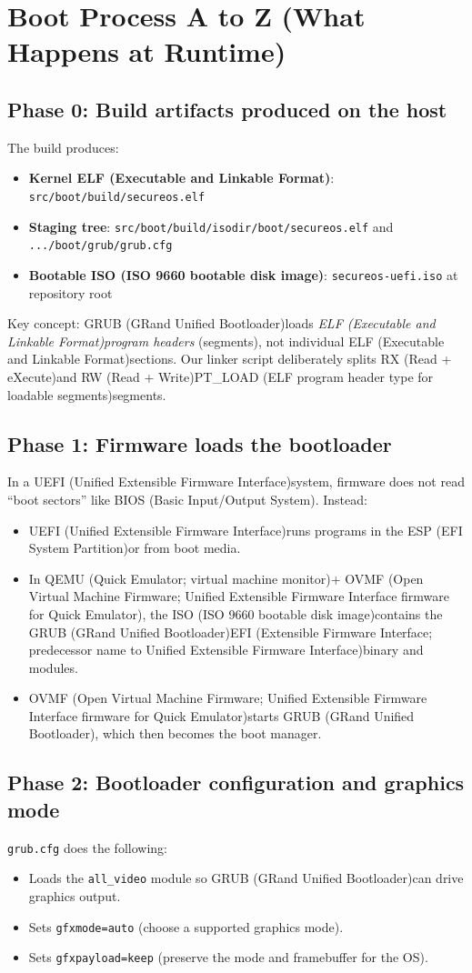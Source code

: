 \documentclass[11pt]{article}
\newcommand{\BIOS}{BIOS (Basic Input/Output System)}
\newcommand{\EFI}{EFI (Extensible Firmware Interface; predecessor name to Unified Extensible Firmware Interface)}
\newcommand{\ESP}{ESP (EFI System Partition)}
\newcommand{\ELF}{ELF (Executable and Linkable Format)}
\newcommand{\GRUB}{GRUB (GRand Unified Bootloader)}
\newcommand{\ISOImg}{ISO (ISO 9660 bootable disk image)}
\newcommand{\OVMF}{OVMF (Open Virtual Machine Firmware; Unified Extensible Firmware Interface firmware for Quick Emulator)}
\newcommand{\PTLOAD}{PT\_LOAD (ELF program header type for loadable segments)}
\newcommand{\QEMU}{QEMU (Quick Emulator; virtual machine monitor)}
\newcommand{\RW}{RW (Read + Write)}
\newcommand{\RX}{RX (Read + eXecute)}
\newcommand{\UEFI}{UEFI (Unified Extensible Firmware Interface)}
\begin{document}
\newpage
\section{Boot Process A to Z (What Happens at Runtime)}

\subsection{Phase 0: Build artifacts produced on the host}
The build produces:
\begin{itemize}
  \item \textbf{Kernel \ELF}: \texttt{src/boot/build/secureos.elf}
  \item \textbf{Staging tree}: \texttt{src/boot/build/isodir/boot/secureos.elf} and \texttt{.../boot/grub/grub.cfg}
  \item \textbf{Bootable \ISOImg}: \texttt{secureos-uefi.iso} at repository root
\end{itemize}

Key concept: \GRUB loads \emph{\ELF program headers} (segments), not individual \ELF sections. Our linker script deliberately splits \RX and \RW \PTLOAD segments.

\subsection{Phase 1: Firmware loads the bootloader}
In a \UEFI system, firmware does not read ``boot sectors'' like \BIOS. Instead:
\begin{itemize}
  \item \UEFI runs programs in the \ESP or from boot media.
  \item In \QEMU + \OVMF, the \ISOImg contains the \GRUB \EFI binary and modules.
  \item \OVMF starts \GRUB, which then becomes the boot manager.
\end{itemize}

\subsection{Phase 2: Bootloader configuration and graphics mode}
\texttt{grub.cfg} does the following:
\begin{itemize}
  \item Loads the \texttt{all\_video} module so \GRUB can drive graphics output.
  \item Sets \texttt{gfxmode=auto} (choose a supported graphics mode).
  \item Sets \texttt{gfxpayload=keep} (preserve the mode and framebuffer for the OS).
\end{itemize}
\end{document}
